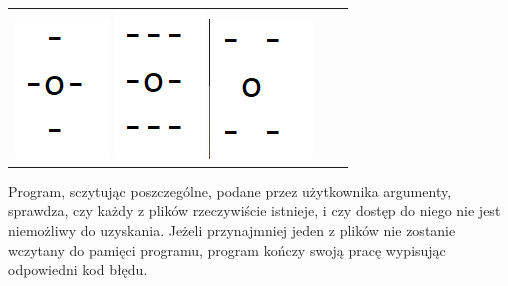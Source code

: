 \documentclass[12pt,a4paper,twoside]{article}
\begin{document}
\begin{center}
\begin{tabular}{ccc}
\includegraphics[scale=1]{grafika3}
\includegraphics[scale=1]{grafika4}
\includegraphics[scale=1]{grafika5}
\end{tabular}
\end{center}

Program, sczytując poszczególne, podane przez użytkownika argumenty, sprawdza, czy każdy z plików rzeczywiście istnieje, i czy dostęp do niego nie jest niemożliwy do uzyskania. Jeżeli przynajmniej jeden z plików nie zostanie wczytany do pamięci programu, program kończy swoją pracę wypisując odpowiedni kod błędu. \par
\end{document}

